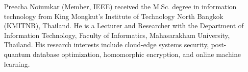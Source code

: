 \documentclass[10pt,journal,compsoc]{IEEEtran}
\begin{document}



\begin{IEEEbiographynophoto}{Preecha Noiumkar}
(Member, IEEE) received the M.Sc. degree in information technology from King Mongkut's Institute of Technology North Bangkok (KMITNB), Thailand. He is a Lecturer and Researcher with the Department of Information Technology, Faculty of Informatics, Mahasarakham University, Thailand. His research interests include cloud-edge systems security, post-quantum database optimization, homomorphic encryption, and online machine learning.
\end{IEEEbiographynophoto}
\end{document}
